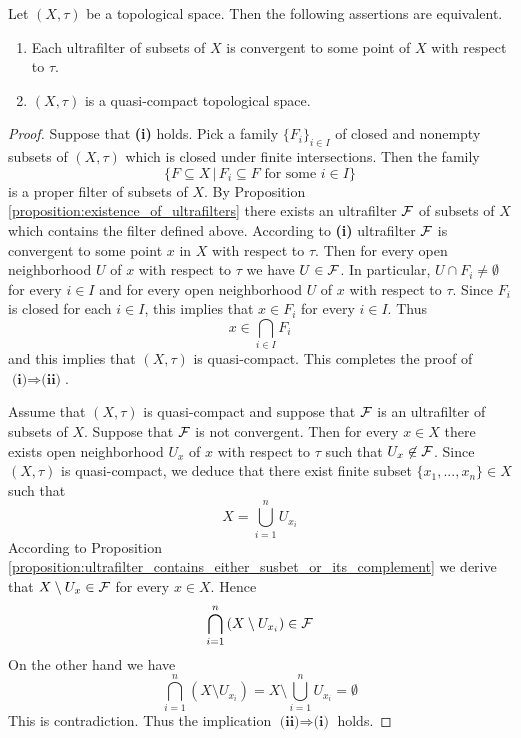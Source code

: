\begin{theorem}\label{theorem:quasi_compact_in_terms_of_ultrafilters}
Let $(X,\tau)$ be a topological space. Then the following assertions are equivalent.
\begin{enumerate}[label=\emph{\textbf{(\roman*)}}, leftmargin=*]
\item Each ultrafilter of subsets of $X$ is convergent to some point of $X$ with respect to $\tau$.
\item $(X,\tau)$ is a quasi-compact topological space.
\end{enumerate}
\end{theorem}
\begin{proof}
Suppose that \textbf{(i)} holds. Pick a family $\{F_i\}_{i\in I}$ of closed and nonempty subsets of $\left(X,\tau\right)$ which is closed under finite intersections. Then the family
$$\big\{F\subseteq X\,\big|\,F_i\subseteq F\mbox{ for some }i\in I\big\}$$
is a proper filter of subsets of $X$. By Proposition \ref{proposition:existence_of_ultrafilters} there exists an ultrafilter ${\mathcal F}$ of subsets of $X$ which contains the filter defined above. According to \textbf{(i)} ultrafilter ${\mathcal F}$ is convergent to some point $x$ in $X$ with respect to $\tau$. Then for every open neighborhood $U$ of $x$ with respect to $\tau$ we have $U \in {\mathcal F}$. In particular, $U\cap F_i \neq \emptyset$ for every $i\in I$ and for every open neighborhood $U$ of $x$ with respect to $\tau$. Since $F_i$ is closed for each $i\in I$, this implies that $x \in F_i$ for every $i \in I$. Thus
$$x \in  \bigcap_{i\in I}F_i$$
and this implies that $\left(X,\tau\right)$ is quasi-compact. This completes the proof of $\textbf{(i)}\Rightarrow \textbf{(ii)}$.

Assume that $(X,\tau)$ is quasi-compact and suppose that ${\mathcal F}$ is an ultrafilter of subsets of $X$. Suppose that ${\mathcal F}$ is not convergent. Then for every $x \in X$ there exists open neighborhood $U_x$ of $x$ with respect to $\tau$ such that $U_x \not \in {\mathcal F}$. Since $\left(X,\tau\right)$ is quasi-compact, we deduce that there exist finite subset $\{x_1,...,x_n\} \in X$ such that 
$$X = \bigcup_{i=1}^nU_{x_i}$$
According to Proposition \ref{proposition:ultrafilter_contains_either_susbet_or_its_complement} we derive that $X\setminus U_x \in {\mathcal F}$ for every $x \in X$. Hence
$$\bigcap_{i=1}^n\left(X\setminus U_{x_i}\right) \in {\mathcal F}$$
On the other hand we have
$$\bigcap_{i=1}^n\left(X\setminus U_{x_i}\right) = X \setminus \bigcup_{i=1}^nU_{x_i} = \emptyset$$
This is contradiction. Thus the implication $\textbf{(ii)}\Rightarrow \textbf{(i)}$ holds.
\end{proof}


